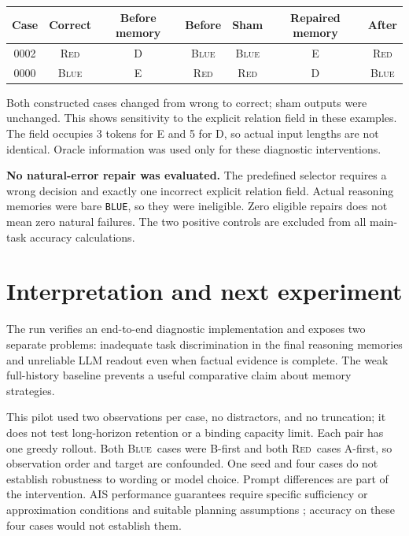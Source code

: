 \documentclass[11pt,letterpaper]{article}
\newcommand{\code}[1]{\texttt{#1}}
\newcommand{\red}{\textsc{Red}}
\newcommand{\blue}{\textsc{Blue}}
\begin{document}
\begin{center}
\small
\begin{tabular}{@{}ccccccc@{}}
\toprule
Case & Correct & Before memory & Before & Sham & Repaired memory & After\\
\midrule
0002 & \red & D & \blue & \blue & E & \red\\
0000 & \blue & E & \red & \red & D & \blue\\
\bottomrule
\end{tabular}
\end{center}
Both constructed cases changed from wrong to correct; sham outputs were unchanged.
This shows sensitivity to the explicit relation field in these examples. The field
occupies 3 tokens for E and 5 for D, so actual input lengths are not identical.
Oracle information was used only for these diagnostic interventions.

\textbf{No natural-error repair was evaluated.} The predefined selector requires a
wrong decision and exactly one incorrect explicit relation field. Actual reasoning
memories were bare \code{BLUE}, so they were ineligible. Zero eligible repairs does
not mean zero natural failures. The two positive controls are excluded from all
main-task accuracy calculations.

\newpage
\section{Interpretation and next experiment}
The run verifies an end-to-end diagnostic implementation and exposes two separate
problems: inadequate task discrimination in the final reasoning memories and
unreliable LLM readout even when factual evidence is complete. The weak full-history
baseline prevents a useful comparative claim about memory strategies.

This pilot used two observations per case, no distractors, and no truncation; it
does not test long-horizon retention or a binding capacity limit. Each pair has one
greedy rollout. Both \blue\ cases were B-first and both \red\ cases A-first, so
observation order and target are confounded. One seed and four cases do not establish
robustness to wording or model choice. Prompt differences are part of the intervention.
AIS performance guarantees require specific sufficiency or approximation conditions
and suitable planning assumptions \cite{ais}; accuracy on these four cases would
not establish them.
\end{document}
